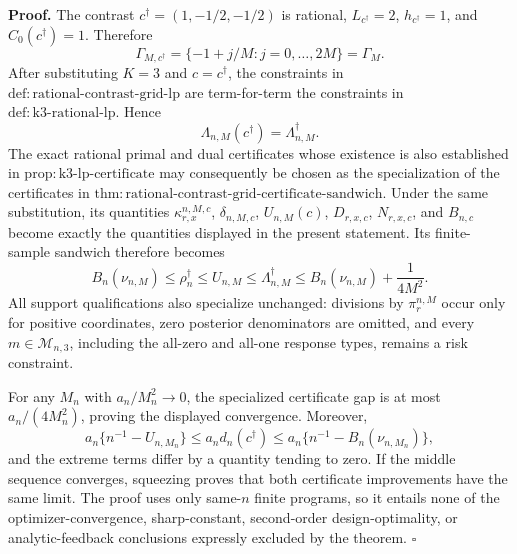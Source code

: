\textbf{Proof.}
The contrast \(c^\dagger=(1,-1/2,-1/2)\) is rational, \(L_{c^\dagger}=2\), \(h_{c^\dagger}=1\), and \(C_0(c^\dagger)=1\).  Therefore
\[
 \Gamma_{M,c^\dagger}=\{-1+j/M:j=0,\ldots,2M\}=\Gamma_M.
\]
After substituting \(K=3\) and \(c=c^\dagger\), the constraints in \(\mathrm{def:rational\text{-}contrast\text{-}grid\text{-}lp}\) are term-for-term the constraints in \(\mathrm{def:k3\text{-}rational\text{-}lp}\).  Hence
\[
 \Lambda_{n,M}(c^\dagger)=\Lambda_{n,M}^\dagger.
\]
The exact rational primal and dual certificates whose existence is also established in \(\mathrm{prop:k3\text{-}lp\text{-}certificate}\) may consequently be chosen as the specialization of the certificates in \(\mathrm{thm:rational\text{-}contrast\text{-}grid\text{-}certificate\text{-}sandwich}\).  Under the same substitution, its quantities \(\kappa_{r,x}^{n,M,c}\), \(\delta_{n,M,c}\), \(U_{n,M}(c)\), \(D_{r,x,c}\), \(N_{r,x,c}\), and \(B_{n,c}\) become exactly the quantities displayed in the present statement.  Its finite-sample sandwich therefore becomes
\[
 B_n(\nu_{n,M})\leq\rho_n^\dagger\leq U_{n,M}
 \leq\Lambda_{n,M}^\dagger
 \leq B_n(\nu_{n,M})+\frac1{4M^2}.
\]
All support qualifications also specialize unchanged: divisions by \(\pi_r^{n,M}\) occur only for positive coordinates, zero posterior denominators are omitted, and every \(m\in\mathcal M_{n,3}\), including the all-zero and all-one response types, remains a risk constraint.

For any \(M_n\) with \(a_n/M_n^2\to0\), the specialized certificate gap is at most \(a_n/(4M_n^2)\), proving the displayed convergence.  Moreover,
\[
 a_n\{n^{-1}-U_{n,M_n}\}
 \leq a_nd_n(c^\dagger)
 \leq a_n\{n^{-1}-B_n(\nu_{n,M_n})\},
\]
and the extreme terms differ by a quantity tending to zero.  If the middle sequence converges, squeezing proves that both certificate improvements have the same limit.  The proof uses only same-\(n\) finite programs, so it entails none of the optimizer-convergence, sharp-constant, second-order design-optimality, or analytic-feedback conclusions expressly excluded by the theorem. \(\square\)